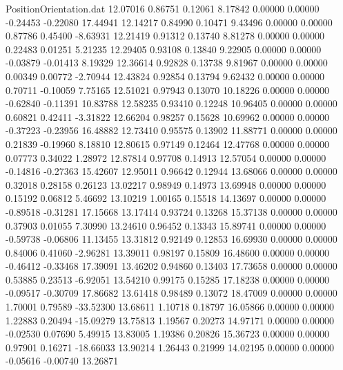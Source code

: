 \begin{filecontents}{PositionOrientation.dat}
  12.07016    0.86751    0.12061     8.17842    0.00000    0.00000   -0.24453   -0.22080   17.44941
  12.14217    0.84990    0.10471     9.43496    0.00000    0.00000    0.87786    0.45400   -8.63931
  12.21419    0.91312    0.13740     8.81278    0.00000    0.00000    0.22483    0.01251    5.21235
  12.29405    0.93108    0.13840     9.22905    0.00000    0.00000   -0.03879   -0.01413    8.19329
  12.36614    0.92828    0.13738     9.81967    0.00000    0.00000    0.00349    0.00772   -2.70944
  12.43824    0.92854    0.13794     9.62432    0.00000    0.00000    0.70711   -0.10059    7.75165
  12.51021    0.97943    0.13070    10.18226    0.00000    0.00000   -0.62840   -0.11391   10.83788
  12.58235    0.93410    0.12248    10.96405    0.00000    0.00000    0.60821    0.42411   -3.31822
  12.66204    0.98257    0.15628    10.69962    0.00000    0.00000   -0.37223   -0.23956   16.48882
  12.73410    0.95575    0.13902    11.88771    0.00000    0.00000    0.21839   -0.19960    8.18810
  12.80615    0.97149    0.12464    12.47768    0.00000    0.00000    0.07773    0.34022    1.28972
  12.87814    0.97708    0.14913    12.57054    0.00000    0.00000   -0.14816   -0.27363   15.42607
  12.95011    0.96642    0.12944    13.68066    0.00000    0.00000    0.32018    0.28158    0.26123
  13.02217    0.98949    0.14973    13.69948    0.00000    0.00000    0.15192    0.06812    5.46692
  13.10219    1.00165    0.15518    14.13697    0.00000    0.00000   -0.89518   -0.31281   17.15668
  13.17414    0.93724    0.13268    15.37138    0.00000    0.00000    0.37903    0.01055    7.30990
  13.24610    0.96452    0.13343    15.89741    0.00000    0.00000   -0.59738   -0.06806   11.13455
  13.31812    0.92149    0.12853    16.69930    0.00000    0.00000    0.84006    0.41060   -2.96281
  13.39011    0.98197    0.15809    16.48600    0.00000    0.00000   -0.46412   -0.33468   17.39091
  13.46202    0.94860    0.13403    17.73658    0.00000    0.00000    0.53885    0.23513   -6.92051
  13.54210    0.99175    0.15285    17.18238    0.00000    0.00000   -0.09517   -0.30709   17.86682
  13.61418    0.98489    0.13072    18.47009    0.00000    0.00000    1.70001    0.79589  -33.52300
  13.68611    1.10718    0.18797    16.05866    0.00000    0.00000    1.22883    0.20494  -15.09279
  13.75813    1.19567    0.20273    14.97171    0.00000    0.00000   -0.02530    0.07690    5.49915
  13.83005    1.19386    0.20826    15.36723    0.00000    0.00000    0.97901    0.16271  -18.66033
  13.90214    1.26443    0.21999    14.02195    0.00000    0.00000   -0.05616   -0.00740   13.26871

\end{filecontents}
